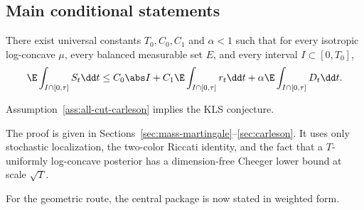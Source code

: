 \documentclass[../../main.tex]{subfiles}
\begin{document}
\subsection{Main conditional statements}

\begin{assumption}
\label{ass:all-cut-carleson}
There exist universal constants $T_0,C_0,C_1$ and $\alpha<1$ such that for every isotropic
log-concave $\mu$, every balanced measurable set $E$, and every interval $I\subset[0,T_0]$,
\begin{equation}\label{eq:all-cut-carleson}
  \E\int_{I\cap[0,\tau]} S_t\dd t
  \le
  C_0\abs I+C_1\E\int_{I\cap[0,\tau]}r_t\dd t
  +\alpha\E\int_{I\cap[0,\tau]}D_t\dd t .
\end{equation}
\end{assumption}

\begin{theorem}
\label{thm:intro-all-cut}
Assumption~\ref{ass:all-cut-carleson} implies the KLS conjecture.
\end{theorem}

The proof is given in Sections~\ref{sec:mass-martingale}--\ref{sec:carleson}. It uses only
stochastic localization, the two-color Riccati identity, and the fact that a $T$-uniformly
log-concave posterior has a dimension-free Cheeger lower bound at scale $\sqrt T$.

For the geometric route, the central package is now stated in weighted form.
\end{document}
